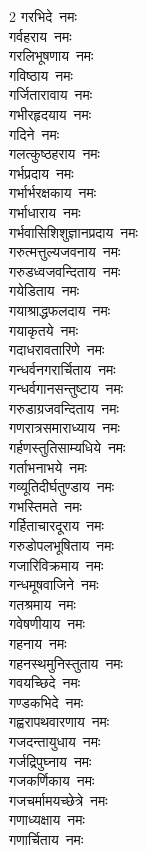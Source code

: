 \begin{flushleft}
\begin{multicols}{2}
गरभिदे~नमः\\
गर्वहराय~नमः\\
गरलिभूषणाय~नमः\\
गविष्ठाय~नमः\\
गर्जितारावाय~नमः\\
गभीरहृदयाय~नमः\\
गदिने~नमः\\
गलत्कुष्ठहराय~नमः\\
गर्भप्रदाय~नमः\\
गर्भार्भरक्षकाय~नमः\hfill{}\\
गर्भाधाराय~नमः\\
गर्भवासिशिशुज्ञानप्रदाय~नमः\\
गरुत्मत्तुल्यजवनाय~नमः\\
गरुडध्वजवन्दिताय~नमः\\
गयेडिताय~नमः\\
गयाश्राद्धफलदाय~नमः\\
गयाकृतये~नमः\\
गदाधरावतारिणे~नमः\\
गन्धर्वनगरार्चिताय~नमः\\
गन्धर्वगानसन्तुष्टाय~नमः\hfill{}\\
गरुडाग्रजवन्दिताय~नमः\\
गणरात्रसमाराध्याय~नमः\\
गर्हणस्तुतिसाम्यधिये~नमः\\
गर्ताभनाभये~नमः\\
गव्यूतिदीर्घतुण्डाय~नमः\\
गभस्तिमते~नमः\\
गर्हिताचारदूराय~नमः\\
गरुडोपलभूषिताय~नमः\\
गजारिविक्रमाय~नमः\\
गन्धमूषवाजिने~नमः\hfill{}\\
गतश्रमाय~नमः\\
गवेषणीयाय~नमः\\
गहनाय~नमः\\
गहनस्थमुनिस्तुताय~नमः\\
गवयच्छिदे~नमः\\
गण्डकभिदे~नमः\\
गह्वरापथवारणाय~नमः\\
गजदन्तायुधाय~नमः\\
गर्जद्रिपुघ्नाय~नमः\\
गजकर्णिकाय~नमः\hfill{}\\
गजचर्मामयच्छेत्रे~नमः\\
गणाध्यक्षाय~नमः\\
गणार्चिताय~नमः\\

\end{multicols}
\end{flushleft}
